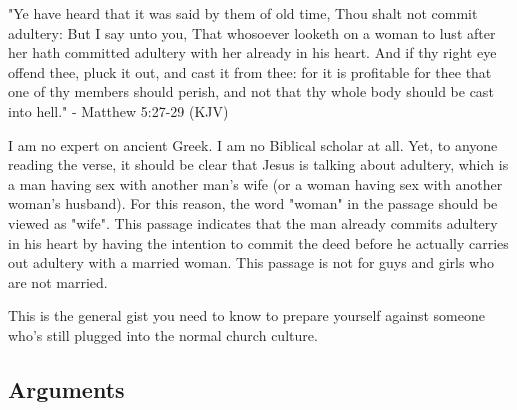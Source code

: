 \documentclass[a4paper, parskip=full, 12pt]{article}
\begin{document}
"Ye have heard that it was said by them of old time, Thou shalt not commit adultery: But I say unto you, That whosoever looketh on a woman to lust after her hath committed adultery with her already in his heart. And if thy right eye offend thee, pluck it out, and cast it from thee: for it is profitable for thee that one of thy members should perish, and not that thy whole body should be cast into hell." - Matthew 5:27-29 (KJV)

I am no expert on ancient Greek. I am no Biblical scholar at all. Yet, to anyone reading the verse, it should be clear that Jesus is talking about adultery, which is a man having sex with another man's wife (or a woman having sex with another woman's husband). For this reason, the word "woman" in the passage should be viewed as "wife". This passage indicates that the man already commits adultery in his heart by having the intention to commit the deed before he actually carries out adultery with a married woman. This passage is not for guys and girls who are not married.

This is the general gist you need to know to prepare yourself against someone who's still plugged into the normal church culture.
\subsection*{Arguments}
\end{document}
